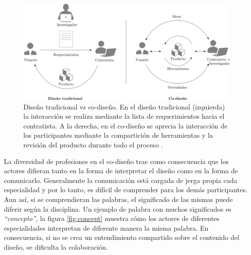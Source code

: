 \begin{figure}[h]
\centering
\includegraphics[width=16cm]{Img/INTRO/intro-codesign0.png}
\caption{\footnotesize{Diseño tradicional vs co-diseño. En el diseño tradicional (izquierda) la interacción se realiza mediante la lista de requerimientos hacia el contratista. A la derecha, en el co-diseño se aprecia la interacción de los participantes mediante la compartición de herramientas y la revisión del producto durante todo el proceso \citep{Sanders2008}.}}
\label{fig:codesign}
\end{figure}


La diversidad de profesiones en el co-diseño trae como consecuencia que los actores difieran tanto en la forma de interpretar el diseño como en la forma de comunicarlo. Generalmente la comunicación está cargada de jerga propia cada  especialidad y por lo tanto, es difícil de comprender para los demás participantes. Aun así, si se comprendieran las palabras, el significado de las mismas puede diferir según la disciplina. Un ejemplo de palabra con muchos significados es \textit{``concepto''}, la figura \ref{fig:concept} muestra cómo los actores de diferentes especialidades interpretan de diferente manera la misma palabra. En consecuencia, si no se crea un entendimiento compartido sobre el contenido del diseño, se dificulta la colaboración. 

